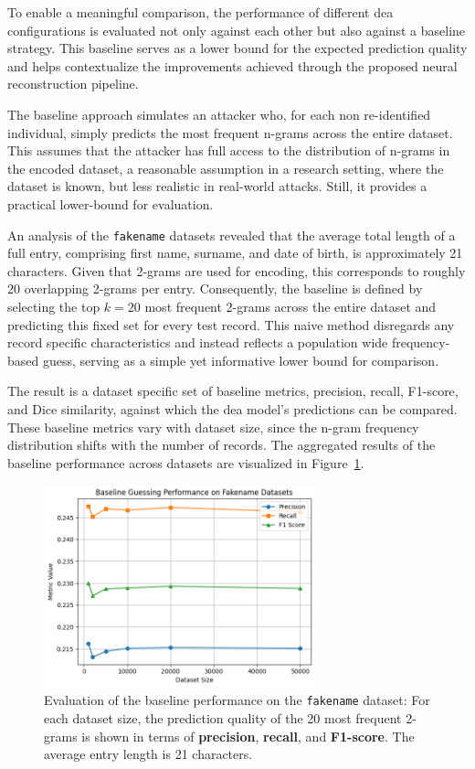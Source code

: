 To enable a meaningful comparison, the performance of different \ac{dea} configurations is evaluated not only against each other but also against a baseline strategy.
This baseline serves as a lower bound for the expected prediction quality and helps contextualize the improvements achieved through the proposed neural reconstruction pipeline.

The baseline approach simulates an attacker who, for each non re-identified individual, simply predicts the most frequent n-grams across the entire dataset.
This assumes that the attacker has full access to the distribution of n-grams in the encoded dataset, a reasonable assumption in a research setting, where the dataset is known, but less realistic in real-world attacks.
Still, it provides a practical lower-bound for evaluation.

An analysis of the \texttt{fakename} datasets revealed that the average total length of a full entry, comprising first name, surname, and date of birth, is approximately 21 characters.
Given that 2-grams are used for encoding, this corresponds to roughly 20 overlapping 2-grams per entry.
Consequently, the baseline is defined by selecting the top $k=20$ most frequent 2-grams across the entire dataset and predicting this fixed set for every test record.
This naive method disregards any record specific characteristics and instead reflects a population wide frequency-based guess, serving as a simple yet informative lower bound for comparison.

The result is a dataset specific set of baseline metrics, precision, recall, F1-score, and Dice similarity, against which the \ac{dea} model's predictions can be compared.
These baseline metrics vary with dataset size, since the n-gram frequency distribution shifts with the number of records.
The aggregated results of the baseline performance across datasets are visualized in Figure~\ref{fig:baseline_metrics}.


\begin{figure}[H]
    \centering
    \includegraphics[width=0.7\textwidth]{img/fakename_analysis.png}
    \caption{Evaluation of the baseline performance on the \texttt{fakename} dataset: For each dataset size, the prediction quality of the 20 most frequent 2-grams is shown in terms of \textbf{precision}, \textbf{recall}, and \textbf{F1-score}. The average entry length is 21 characters.}
    \label{fig:baseline_metrics}
\end{figure}

